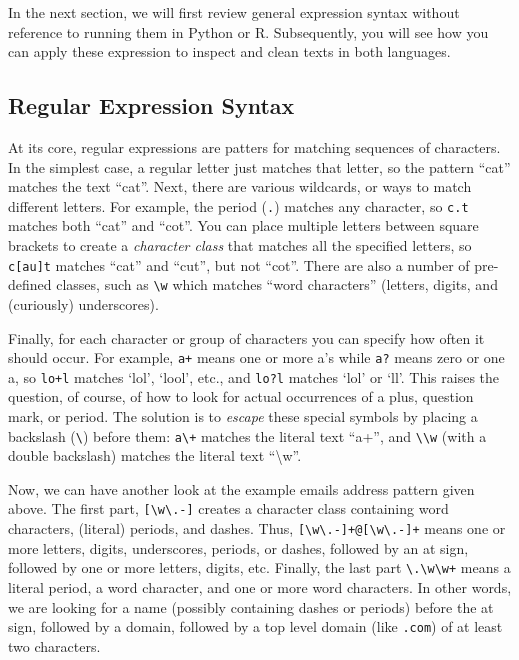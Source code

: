 In the next section, we will first review general expression syntax without reference to running them in Python or R.
Subsequently, you will see how you can apply these expression to inspect and clean texts in both languages.

\subsection{Regular Expression Syntax}

At its core, regular expressions are patters for matching sequences of characters.
In the simplest case, a regular letter just matches that letter, so the pattern ``cat'' matches the text ``cat''.
Next, there are various wildcards, or ways to match different letters.
For example, the period (\verb|.|) matches any character, so \verb|c.t| matches both ``cat'' and ``cot''.
You can place multiple letters between square brackets to create a \emph{character class} that matches all the specified letters, so \verb|c[au]t| matches ``cat'' and ``cut'', but not ``cot''.
There are also a number of pre-defined classes, such as \verb|\w| which matches ``word characters'' (letters, digits, and (curiously) underscores).

Finally, for each character or group of characters you can specify how often it should occur.
For example, \verb|a+| means one or more a's while \verb|a?| means zero or one a, so \verb|lo+l| matches `lol', `lool', etc.,
and \verb|lo?l| matches `lol' or `ll'.
This raises the question, of course, of how to look for actual occurrences of a plus, question mark, or period.
The solution is to \emph{escape} these special symbols by placing a backslash (\verb|\|) before them:
\verb|a\+| matches the literal text ``a+'', and \verb|\\w| (with a double backslash) matches the literal text ``\textbackslash{}w''.

Now, we can have another look at the example emails address pattern given above.
The first part, \verb|[\w\.-]| creates a character class containing word characters, (literal) periods, and dashes.
Thus, \verb|[\w\.-]+@[\w\.-]+| means one or more letters, digits, underscores, periods, or dashes, followed by an at sign,
followed by one or more letters, digits, etc.
Finally, the last part \verb|\.\w\w+| means a literal period, a word character, and one or more word characters.
In other words, we are looking for a name (possibly containing dashes or periods) before the at sign,
followed by a domain, followed by a top level domain (like \verb|.com|) of at least two characters.


